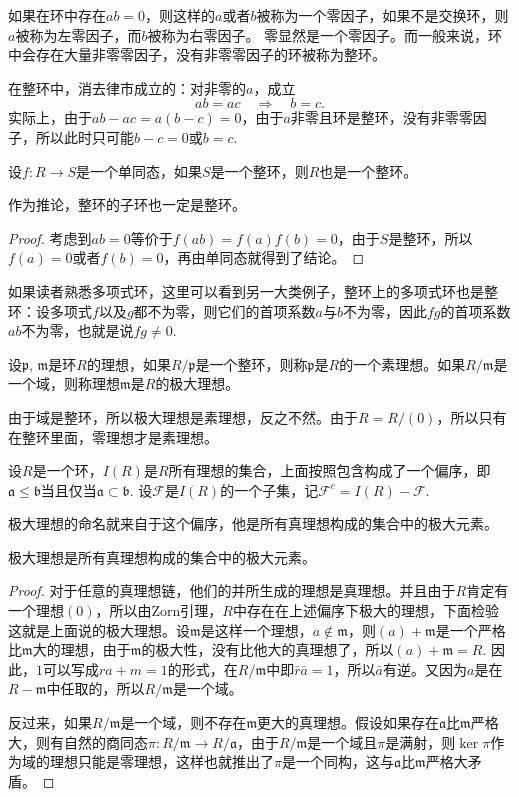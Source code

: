 \para[零因子与整环] 如果在环中存在$ab=0$，则这样的$a$或者$b$被称为一个零因子，如果不是交换环，则$a$被称为左零因子，而$b$被称为右零因子。
零显然是一个零因子。而一般来说，环中会存在大量非零零因子，没有非零零因子的环被称为整环。\endpara

在整环中，消去律市成立的：对非零的$a$，成立
\[
	ab=ac \quad \Rightarrow \quad b=c.
\]
实际上，由于$ab-ac=a(b-c)=0$，由于$a$非零且环是整环，没有非零零因子，所以此时只可能$b-c=0$或$b=c$.

\begin{lem}
	设$f:R\to S$是一个单同态，如果$S$是一个整环，则$R$也是一个整环。
\end{lem}

作为推论，整环的子环也一定是整环。

\begin{proof}
	考虑到$ab=0$等价于$f(ab)=f(a)f(b)=0$，由于$S$是整环，所以$f(a)=0$或者$f(b)=0$，再由单同态就得到了结论。
\end{proof}

如果读者熟悉多项式环，这里可以看到另一大类例子，整环上的多项式环也是整环：设多项式$f$以及$g$都不为零，则它们的首项系数$a$与$b$不为零，因此$fg$的首项系数$ab$不为零，也就是说$fg\neq 0$.

\para[素理想与极大理想] 设$\mathfrak{p}$, $\mathfrak{m}$是环$R$的理想，如果$R/\mathfrak{p}$是一个整环，则称$\mathfrak{p}$是$R$的一个素理想。如果$R/\mathfrak{m}$是一个域，则称理想$\mathfrak{m}$是$R$的极大理想。\endpara

由于域是整环，所以极大理想是素理想，反之不然。由于$R=R/(0)$，所以只有在整环里面，零理想才是素理想。

\para[理想集的偏序] 设$R$是一个环，$I(R)$是$R$所有理想的集合，上面按照包含构成了一个偏序，即$\mathfrak{a}\leq \mathfrak{b}$当且仅当$\mathfrak{a}\subset \mathfrak{b}$. 设$\mathcal{F}$是$I(R)$的一个子集，记$\mathcal{F}^c=I(R)-\mathcal{F}$.\endpara

极大理想的命名就来自于这个偏序，他是所有真理想构成的集合中的极大元素。

\begin{pro}
	极大理想是所有真理想构成的集合中的极大元素。
\end{pro}

\begin{proof}
	对于任意的真理想链，他们的并所生成的理想是真理想。并且由于$R$肯定有一个理想$(0)$，所以由Zorn引理，$R$中存在在上述偏序下极大的理想，下面检验这就是上面说的极大理想。设$\mathfrak{m}$是这样一个理想，$a\notin \mathfrak{m}$，则$(a)+\mathfrak{m}$是一个严格比$\mathfrak{m}$大的理想，由于$\mathfrak{m}$的极大性，没有比他大的真理想了，所以$(a)+\mathfrak{m}=R$. 因此，$1$可以写成$ra+m=1$的形式，在$R/\mathfrak{m}$中即$\bar{r}\bar{a}=1$，所以$\bar{a}$有逆。又因为$a$是在$R-\mathfrak{m}$中任取的，所以$R/\mathfrak{m}$是一个域。

	反过来，如果$R/\mathfrak{m}$是一个域，则不存在$\mathfrak{m}$更大的真理想。假设如果存在$\mathfrak{a}$比$\mathfrak{m}$严格大，则有自然的商同态$\pi:R/\mathfrak{m}\to R/\mathfrak{a}$，由于$R/\mathfrak{m}$是一个域且$\pi$是满射，则$\ker \pi$作为域的理想只能是零理想，这样也就推出了$\pi$是一个同构，这与$\mathfrak{a}$比$\mathfrak{m}$严格大矛盾。
\end{proof}

